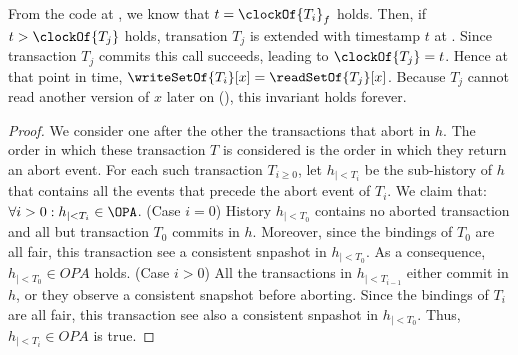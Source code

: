    From the code at , we know that $t=\clockOf{T_i}_f$ holds.
    Then, if $t > \clockOf{T_j}$ holds, transation $T_j$ is extended with timestamp $t$ at .
    Since transaction $T_j$ commits this call succeeds, leading to $\clockOf{T_j} = t$.
    Hence at that point in time, $\writeSetOf{T_i}[x] = \readSetOf{T_j}[x]$.
    Because $T_j$ cannot read another version of $x$ later on (), this invariant holds forever.


    \begin{proof}
  We consider one after the other the transactions that abort in $h$.
  The order in which these transaction $T$ is considered is the order in which they return an abort event.
  For each such transaction $T_{i \geq 0}$, let $h_{|<T_i}$ be the sub-history of $h$ that contains all the events that precede the abort event of $T_i$.
  We claim that: $\forall i > 0 : h_{|<T_i} \in \OPA$.
  (Case $i=0$)
  History $h_{|<T_0}$ contains no aborted transaction and all but transaction $T_0$ commits in $h$.
  Moreover, since the bindings of $T_0$ are all fair, this transaction see a consistent snpashot in $h_{|<T_0}$.
  As a consequence, $h_{|<T_0} \in OPA$ holds.
  (Case $i>0$)
  All the transactions in $h_{|<T_{i-1}}$ either commit in $h$, or they observe a consistent snapshot before aborting.
  Since the bindings of $T_i$ are all fair, this transaction see also a consistent snpashot in $h_{|<T_0}$.
  Thus, $h_{|<T_i} \in OPA$ is true.  
\end{proof}
